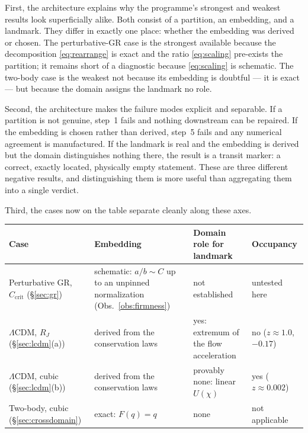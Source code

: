 \documentclass[11pt,a4paper]{article}
\theoremstyle{definition}
\theoremstyle{plain}
\theoremstyle{remark}
\newcommand{\Ccrit}{C_{\mathrm{crit}}}
\begin{document}
First, the architecture explains why the programme's strongest and weakest
results look superficially alike. Both consist of a partition, an embedding,
and a landmark. They differ in exactly one place: whether the embedding was
derived or chosen. The perturbative-GR case is the strongest available because
the decomposition \eqref{eq:rearrange} is exact and the ratio
\eqref{eq:scaling} pre-exists the partition; it remains short of a diagnostic
because \eqref{eq:scaling} is schematic. The two-body case is the weakest not
because its embedding is doubtful --- it is exact --- but because the domain
assigns the landmark no role.

Second, the architecture makes the failure modes explicit and separable. If a
partition is not genuine, step~1 fails and nothing downstream can be repaired.
If the embedding is chosen rather than derived, step~5 fails and any numerical
agreement is manufactured. If the landmark is real and the embedding is derived
but the domain distinguishes nothing there, the result is a transit marker: a
correct, exactly located, physically empty statement. These are three different
negative results, and distinguishing them is more useful than aggregating them
into a single verdict.

Third, the cases now on the table separate cleanly along these axes.

\begin{center}
\small
\begin{tabular}{@{}p{3.0cm}p{3.4cm}p{3.2cm}p{3.0cm}@{}}
\toprule
Case & Embedding & Domain role for landmark & Occupancy \\
\midrule
Perturbative GR, $\Ccrit$ (\S\ref{sec:gr})
& schematic: $a/b\sim C$ up to an unpinned normalization
  (Obs.~\ref{obs:firmness})
& not established
& untested here \\
$\Lambda$CDM, $R_{J}$ (\S\ref{sec:lcdm}(a))
& derived from the conservation laws
& yes: extremum of the flow acceleration
& no ($z\approx1.0$, $-0.17$) \\
$\Lambda$CDM, cubic (\S\ref{sec:lcdm}(b))
& derived from the conservation laws
& provably none: linear $U(\chi)$
& yes ($z\approx0.002$) \\
Two-body, cubic (\S\ref{sec:crossdomain})
& exact: $F(q)=q$
& none
& not applicable \\
\bottomrule
\end{tabular}
\end{center}
\end{document}
